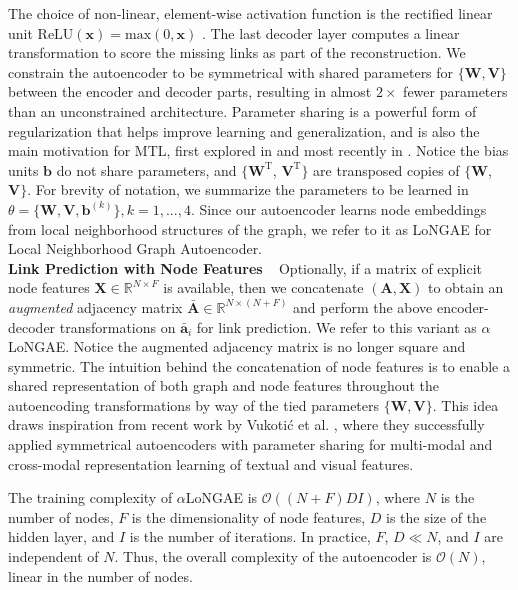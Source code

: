 \documentclass[letterpaper, conference]{IEEEtran}  %
\begin{document}
The choice of non-linear, element-wise activation function is the rectified linear unit $\text{ReLU}(\mathbf{x}) = \text{max}(0, \mathbf{x})$ \cite{Nair:2010}. The last decoder layer computes a linear transformation to score the missing links as part of the reconstruction. We constrain the autoencoder to be symmetrical with shared parameters for $\{\mathbf{W},\mathbf{V}\}$ between the encoder and decoder parts, resulting in almost $2\times$ fewer parameters than an unconstrained architecture. Parameter sharing is a powerful form of regularization that helps improve learning and generalization, and is also the main motivation for MTL, first explored in \cite{Caruana:1993} and most recently in \cite{Yang:2017}. Notice the bias units $\mathbf{b}$ do not share parameters, and $\big\{\mathbf{W}^\text{T}$, $\mathbf{V}^\text{T}\big\}$ are transposed copies of $\{\mathbf{W}$, $\mathbf{V}\}$. For brevity of notation, we summarize the parameters to be learned in $\theta = \big\{\mathbf{W}, \mathbf{V}, \mathbf{b}^{(k)}\big\}, k=1,...,4$. Since our autoencoder learns node embeddings from local neighborhood structures of the graph, we refer to it as LoNGAE for Local Neighborhood Graph Autoencoder.\\

\noindent \textbf{Link Prediction with Node Features} ~ Optionally, if a matrix of explicit node features $\mathbf{X} \in \mathbb{R}^{N \times F}$ is available, then we concatenate $(\mathbf{A},\mathbf{X})$ to obtain an \emph{augmented} adjacency matrix $\mathbf{\bar{A}} \in \mathbb{R}^{N \times (N + F)}$ and perform the above encoder-decoder transformations on $\mathbf{\bar{a}}_i$ for link prediction. We refer to this variant as $\alpha$LoNGAE. Notice the augmented adjacency matrix is no longer square and symmetric. The intuition behind the concatenation of node features is to enable a shared representation of both graph and node features throughout the autoencoding transformations by way of the tied parameters $\{\mathbf{W},\mathbf{V}\}$. This idea draws inspiration from recent work by Vukoti{\'c} et al. \cite{Vukotic:2016}, where they successfully applied symmetrical autoencoders with parameter sharing for multi-modal and cross-modal representation learning of textual and visual features.

The training complexity of $\alpha$LoNGAE is $\mathcal{O}((N+F)DI)$, where $N$ is the number of nodes, $F$ is the dimensionality of node features, $D$ is the size of the hidden layer, and $I$ is the number of iterations. In practice, $F$, $D \ll N$, and $I$ are independent of $N$. Thus, the overall complexity of the autoencoder is $\mathcal{O}(N)$, linear in the number of nodes.\\
\end{document}
